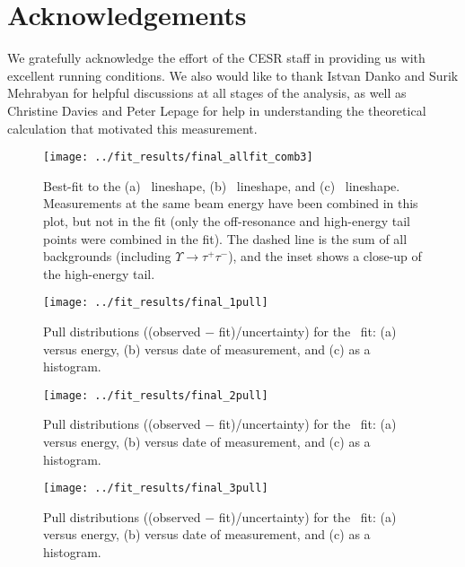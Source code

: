 \documentclass[aps,prd,preprint,superscriptaddress,tightenlines,nofootinbib,floatfix]{revtex4}
\begin{document}
\section{Acknowledgements}
%

We gratefully acknowledge the effort of the CESR staff in providing us
with excellent running conditions.  We also would like to thank Istvan
Danko and Surik Mehrabyan for helpful discussions at all stages of the
analysis, as well as Christine Davies and Peter Lepage for help in
understanding the theoretical calculation that motivated this
measurement.

\begin{figure}[H]
  \texttt{[image: ../fit\_results/final\_allfit\_comb3]}
  \caption{\label{fig:fits} Best-fit to the (a) \uone\ lineshape, (b)
    \utwo\ lineshape, and (c) \uthree\ lineshape.  Measurements at the
    same beam energy have been combined in this plot, but not in the
    fit (only the off-resonance and high-energy tail points were
    combined in the fit).  The dashed line is the sum of all
    backgrounds (including $\Upsilon \to \tau^+\tau^-$), and the inset
    shows a close-up of the high-energy tail.}
\end{figure}

\begin{figure}[H]
  \texttt{[image: ../fit\_results/final\_1pull]}
  \caption{\label{fig:pull1} Pull distributions ((observed $-$
    fit)/uncertainty) for the \uone\ fit: (a) versus energy, (b)
    versus date of measurement, and (c) as a histogram.}
\end{figure}

\begin{figure}[H]
  \texttt{[image: ../fit\_results/final\_2pull]}
  \caption{\label{fig:pull2} Pull distributions ((observed $-$
    fit)/uncertainty) for the \utwo\ fit: (a) versus energy, (b)
    versus date of measurement, and (c) as a histogram.}
\end{figure}

\begin{figure}[H]
  \texttt{[image: ../fit\_results/final\_3pull]}
  \caption{\label{fig:pull3} Pull distributions ((observed $-$
    fit)/uncertainty) for the \uthree\ fit: (a) versus energy, (b)
    versus date of measurement, and (c) as a histogram.}
\end{figure}
\end{document}
